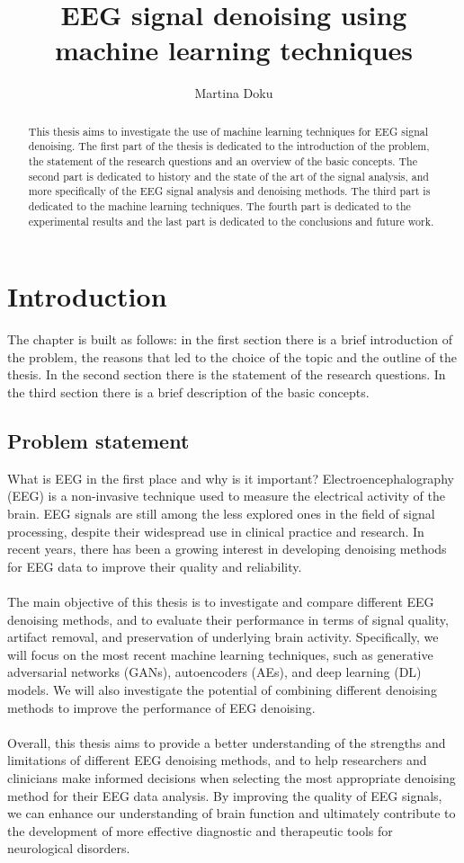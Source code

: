 \documentclass[a4paper]{sapthesis}
\title{EEG signal denoising using machine learning techniques}
\author{Martina Doku}
\begin{document}
\maketitle
\dedication{dedication}
\begin{abstract}
This thesis aims to investigate the use of machine learning
 techniques for EEG signal denoising. The first part of the
thesis is dedicated to the introduction of the problem, the statement
of the research questions and an overview of the basic concepts.
The second part is dedicated to history and 
the state of
the art of the signal analysis, and more specifically of the EEG signal
analysis and denoising methods. The third part is dedicated to the
 machine learning techniques.
The fourth part is dedicated to the experimental results and the last part
is dedicated to the conclusions and future work.
\end{abstract}
\tableofcontents
\chapter{Introduction}
The chapter is built as follows: in the first section there is a brief
introduction of the problem, the reasons that led to the choice of the
topic and the outline of the thesis. In the second section there is the
statement of the research questions. In the third section there is a brief
description of the basic concepts.
\section{Problem statement}
What is EEG in the first place and why is it important? Electroencephalography 
(EEG) is a non-invasive technique used to measure the electrical activity of
the brain. EEG signals are still among the less explored ones in the
field of signal processing, despite their widespread use in clinical 
practice and research. In recent years, there has been a growing 
interest in developing denoising methods for EEG data to improve their 
quality and reliability.\\ \\
The main objective of this thesis is to investigate and compare different
 EEG denoising methods, and to evaluate their performance in terms of 
 signal quality, artifact removal, and preservation of underlying brain
activity. Specifically, we will focus on the most recent machine learning
techniques, such as generative adversarial networks (GANs), autoencoders
(AEs), and deep learning (DL) models. We will also investigate the 
potential of combining different denoising methods to improve the 
performance of EEG denoising. \\ \\
Overall, this thesis aims to provide a better understanding of the strengths
 and limitations of different EEG denoising methods, and to help researchers
  and clinicians make informed decisions when selecting the most appropriate
   denoising method for their EEG data analysis. By improving the quality of
    EEG signals, we can enhance our understanding of brain function and 
    ultimately contribute to the development of more effective diagnostic 
    and therapeutic tools for neurological disorders.
\end{document}
